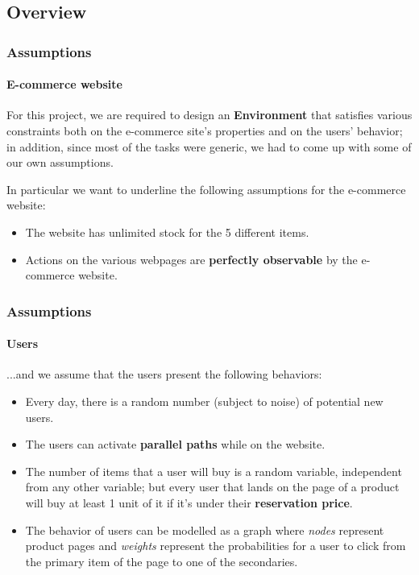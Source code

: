 
\subsection{Overview}


\begin{frame}

\frametitle{Assumptions}
\framesubtitle{E-commerce website}

For this project, we are required to design an \textbf{Environment} that satisfies various constraints both on the e-commerce site's properties and on the users' behavior; in addition, since most of the tasks were generic, we had to come up with some of our own assumptions.

In particular we want to underline the following assumptions for the e-commerce website:
\begin{itemize}[label={-}]
    \item The website has unlimited stock for the 5 different items.
    \item Actions on the various webpages are \textbf{perfectly observable} by the e-commerce website.
\end{itemize}

\end{frame}


\begin{frame}

\frametitle{Assumptions}
\framesubtitle{Users}

...and we assume that the users present the following behaviors:
\begin{itemize}[label={-}]
    \item Every day, there is a random number (subject to noise) of potential new users.
    \item The users can activate \textbf{parallel paths} while on the website.
    \item The number of items that a user will buy is a random variable, independent from any other variable; but every user that lands on the page of a product will buy at least 1 unit of it if it's under their \textbf{reservation price}.
    \item The behavior of users can be modelled as a graph where \textit{nodes} represent product pages and \textit{weights} represent the probabilities for a user to click from the primary item of the page to one of the secondaries.
\end{itemize}

\end{frame}

